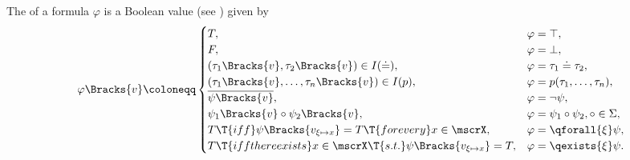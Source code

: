 \begin{definition}
\begin{defenum}
     The  of a formula \( \varphi \) is a Boolean value (see ) given by
    \begin{equation}\label{eq:def:first_order_valuation/formula_valuation}
      \varphi\Bracks{v} \coloneqq \begin{cases}
        T,                                                                              &\varphi = \top, \\
        F,                                                                              &\varphi = \bot, \\
        (\tau_1\Bracks{v}, \tau_2\Bracks{v}) \in I(\doteq),                         &\varphi = \tau_1 \doteq \tau_2, \\
        (\tau_1\Bracks{v}, \ldots, \tau_n\Bracks{v}) \in I(p),                      &\varphi = p(\tau_1, \ldots, \tau_n), \\
        \overline{\psi\Bracks{v}},                                                          &\varphi = \neg \psi, \\
        \psi_1\Bracks{v} \circ \psi_2\Bracks{v},                                    &\varphi = \psi_1 \circ \psi_2, \circ \in \Sigma, \\
        T \T{iff} \psi\Bracks{v_{\xi \mapsto x}} = T \T{for every} x \in \mscrX,         &\varphi = \qforall{\xi} \psi, \\
        T \T{iff there exists} x \in \mscrX \T{s.t.} \psi\Bracks{v_{\xi \mapsto x}} = T, &\varphi = \qexists{\xi} \psi.
      \end{cases}
    \end{equation}
  \end{defenum}
\end{definition}

